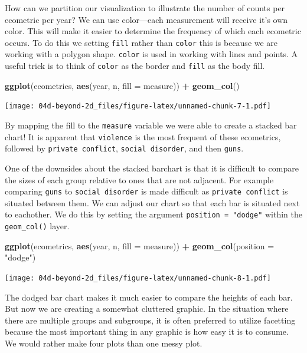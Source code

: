 \documentclass[
]{book}
\newenvironment{Shaded}{\begin{snugshade}}{\end{snugshade}}
\newcommand{\DataTypeTok}[1]{\textcolor[rgb]{0.13,0.29,0.53}{#1}}
\newcommand{\KeywordTok}[1]{\textcolor[rgb]{0.13,0.29,0.53}{\textbf{#1}}}
\newcommand{\NormalTok}[1]{#1}
\newcommand{\OperatorTok}[1]{\textcolor[rgb]{0.81,0.36,0.00}{\textbf{#1}}}
\newcommand{\StringTok}[1]{\textcolor[rgb]{0.31,0.60,0.02}{#1}}
\begin{document}
How can we partition our visualization to illustrate the number of counts per ecometric per year? We can use color---each measurement will receive it's own color. This will make it easier to determine the frequency of which each ecometric occurs. To do this we setting \texttt{fill} rather than \texttt{color} this is because we are working with a polygon shape. \texttt{color} is used in working with lines and points. A useful trick is to think of \texttt{color} as the border and \texttt{fill} as the body fill.

\begin{Shaded}
\begin{Highlighting}[]
\KeywordTok{ggplot}\NormalTok{(ecometrics, }\KeywordTok{aes}\NormalTok{(year, n, }\DataTypeTok{fill =}\NormalTok{ measure)) }\OperatorTok{+}
\StringTok{  }\KeywordTok{geom\_col}\NormalTok{()}
\end{Highlighting}
\end{Shaded}

\texttt{[image: 04d-beyond-2d\_files/figure-latex/unnamed-chunk-7-1.pdf]}

By mapping the fill to the \texttt{measure} variable we were able to create a stacked bar chart! It is apparent that \texttt{violence} is the most frequent of these ecometrics, followed by \texttt{private\ conflict}, \texttt{social\ disorder}, and then \texttt{guns}.

One of the downsides about the stacked barchart is that it is difficult to compare the sizes of each group relative to ones that are not adjacent. For example comparing \texttt{guns} to \texttt{social\ disorder} is made difficult as \texttt{private\ conflict} is situated between them. We can adjust our chart so that each bar is situated next to eachother. We do this by setting the argument \texttt{position\ =\ "dodge"} within the \texttt{geom\_col()} layer.

\begin{Shaded}
\begin{Highlighting}[]
\KeywordTok{ggplot}\NormalTok{(ecometrics, }\KeywordTok{aes}\NormalTok{(year, n, }\DataTypeTok{fill =}\NormalTok{ measure)) }\OperatorTok{+}
\StringTok{  }\KeywordTok{geom\_col}\NormalTok{(}\DataTypeTok{position =} \StringTok{"dodge"}\NormalTok{)}
\end{Highlighting}
\end{Shaded}

\texttt{[image: 04d-beyond-2d\_files/figure-latex/unnamed-chunk-8-1.pdf]}

The dodged bar chart makes it much easier to compare the heights of each bar. But now we are creating a somewhat cluttered graphic. In the situation where there are multiple groups and subgroups, it is often preferred to utilize facetting because the most important thing in any graphic is how easy it is to consume. We would rather make four plots than one messy plot.
\end{document}
